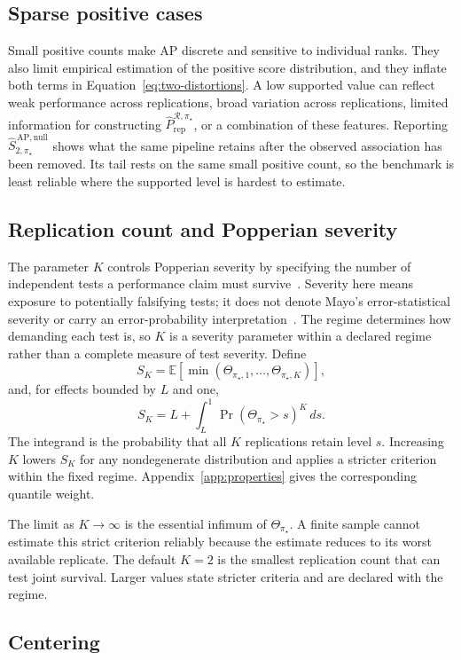 \documentclass[11pt]{article}
\newcommand{\Regime}{\mathcal{R}}
\newcommand{\E}{\mathbb{E}}
\newcommand{\SAPnullHat}{\widehat S_{2,\pi_\star}^{\,\mathrm{AP,null}}}
\newcommand{\PRepHat}{\widehat{P}_{\mathrm{rep}}^{\Regime,\pi_\star}}
\theoremstyle{remark}
\begin{document}
\subsection{Sparse positive cases}
\label{sec:sparse}

Small positive counts make AP discrete and sensitive to individual ranks. They also limit empirical estimation of the positive score distribution, and they inflate both terms in Equation~\eqref{eq:two-distortions}. A low supported value can reflect weak performance across replications, broad variation across replications, limited information for constructing $\PRepHat$, or a combination of these features. Reporting $\SAPnullHat$ shows what the same pipeline retains after the observed association has been removed. Its tail rests on the same small positive count, so the benchmark is least reliable where the supported level is hardest to estimate.

\subsection{Replication count and Popperian severity}

The parameter $K$ controls Popperian severity by specifying the number of independent tests a performance claim must survive~\cite{popper1959logic}. Severity here means exposure to potentially falsifying tests; it does not denote Mayo's error-statistical severity or carry an error-probability interpretation~\cite{mayo1996error}. The regime determines how demanding each test is, so $K$ is a severity parameter within a declared regime rather than a complete measure of test severity. Define
\[
S_K
=
\E\left[
\min(\Theta_{\pi_\star,1},\ldots,\Theta_{\pi_\star,K})
\right],
\]
and, for effects bounded by $L$ and one,
\[
S_K
=
L+\int_L^1\Pr(\Theta_{\pi_\star}>s)^K\,ds .
\]
The integrand is the probability that all $K$ replications retain level $s$. Increasing $K$ lowers $S_K$ for any nondegenerate distribution and applies a stricter criterion within the fixed regime. Appendix~\ref{app:properties} gives the corresponding quantile weight.

The limit as $K\to\infty$ is the essential infimum of $\Theta_{\pi_\star}$. A finite sample cannot estimate this strict criterion reliably because the estimate reduces to its worst available replicate. The default $K=2$ is the smallest replication count that can test joint survival. Larger values state stricter criteria and are declared with the regime.

\subsection{Centering}
\end{document}
